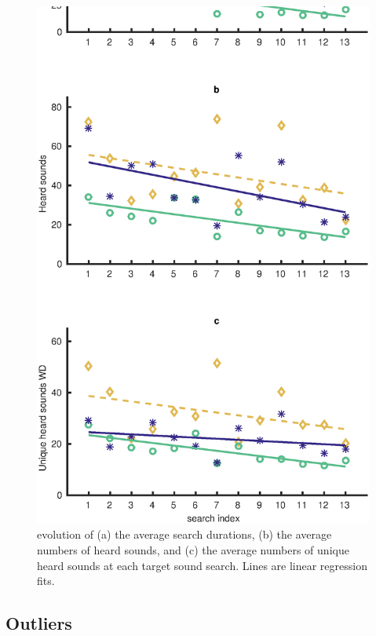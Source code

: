 \documentclass{aes2e}
\newcommand{\gl}[1]{\textcolor{red}{Gregoire : #1}}
\begin{document}
\begin{figure}[t]
\begin{center}
\includegraphics[scale=0.4]{gfx/analyse_music2.eps} 
\end{center}
\caption{\label{fig2Music} evolution of (a) the average search durations, (b) the average numbers of heard sounds, and (c) the average numbers of unique heard sounds at each target sound search. Lines are linear regression fits.}
\end{figure}


\subsection{Outliers}
\end{document}
